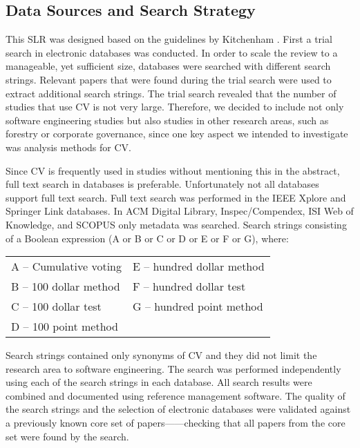 \subsection{Data Sources and Search Strategy}
This SLR was designed based on the guidelines by Kitchenham \citep{Kitchenham2007}. First a trial search in electronic databases was conducted. In order to scale the review to a manageable, yet sufficient size, databases were searched with different search strings. Relevant papers that were found during the trial search were used to extract additional search strings. The trial search revealed that the number of studies that use CV is not very large. Therefore, we decided to include not only software engineering studies but also studies in other research areas, such as forestry or corporate governance, since one key aspect we intended to investigate was analysis methods for CV.

Since CV is frequently used in studies without mentioning this in the abstract, full text search in databases is preferable. Unfortunately not all databases support full text search. Full text search was performed in the IEEE Xplore and Springer Link databases. In ACM Digital Library, Inspec\slash Compendex, ISI Web of Knowledge, and SCOPUS only metadata was searched.
Search strings consisting of a Boolean expression (A or B or C or D or E or F or G), where:

\begin{table}
	\scriptsize
\begin{tabular}{
>{\raggedright}p{}
>{\raggedright}p{}
}
A -- Cumulative voting & E -- hundred dollar method \tabularnewline
B -- 100 dollar method & F -- hundred dollar test \tabularnewline
C -- 100 dollar test & G -- hundred point method \tabularnewline
D -- 100 point method & \tabularnewline
\end{tabular}
\end{table}

Search strings contained only synonyms of CV and they did not limit the research area to software engineering. The search was performed independently using each of the search strings in each database. 
All search results were combined and documented using reference management software. The quality of the search strings and the selection of electronic databases were validated against a previously known core set of papers---\citep{Ahl2005,Berander2006,Chatzipetrou2010,Regnell2001}---checking that all papers from the core set were found by the search.

